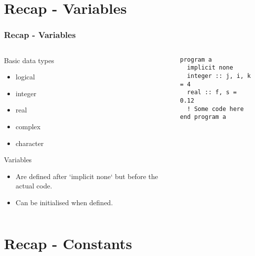
\subtitle{Lecture 2: Recap of Basic Fortran Topics}



\begin{frame}
  \titlepage
\end{frame}

\section{Recap - Variables}

\begin{frame}[fragile]
  \frametitle{Recap - Variables}
  \begin{columns}[T]
    \begin{column}{0.5\textwidth}
    \begin{block}{Basic data types}
      \begin{itemize}
          \item logical
          \item integer
          \item real
          \item complex
          \item character
      \end{itemize}
    \end{block}

    \begin{block}{Variables}
      \begin{itemize}
        \item Are defined after `implicit none` but before the actual code.
        \item Can be initialised when defined.
      \end{itemize}        
    \end{block}
    \end{column}
    
    \begin{column}{0.5\textwidth}
      \begin{lstlisting}
program a
  implicit none
  integer :: j, i, k = 4
  real :: f, s = 0.12
  ! Some code here
end program a
      \end{lstlisting}
    \end{column}
  \end{columns}
\end{frame}

\section{Recap - Constants}

